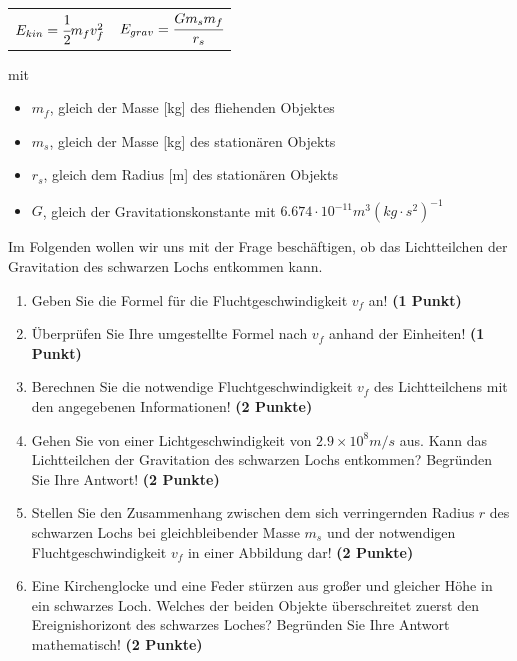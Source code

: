 \documentclass[a4paper, 9pt]{scrartcl}\usepackage[]{graphicx}\usepackage[]{xcolor}
\begin{document}
\begin{center}
  \begin{tabular}{cc}
    $E_{kin} = \cfrac{1}{2}m_fv_f^2$ & $E_{grav} = \cfrac{Gm_sm_f}{r_s}$\\
  \end{tabular}
\end{center}

mit

\begin{itemize}[noitemsep]
\item $m_f$, gleich der Masse [kg] des fliehenden Objektes
\item $m_s$, gleich der Masse [kg] des station{\"a}ren Objekts
\item $r_s$, gleich dem Radius [m] des station{\"a}ren Objekts  
\item $G$, gleich der Gravitationskonstante mit $6.674 \cdot 10^{-11}
  m^3(kg \cdot s^2)^{-1}$ 
\end{itemize}

Im Folgenden wollen wir uns mit der Frage besch{\"a}ftigen, ob das
Lichtteilchen der Gravitation des schwarzen Lochs entkommen kann.

\begin{enumerate}
\item Geben Sie die Formel f{\"u}r die Fluchtgeschwindigkeit $v_f$ an! 
  \textbf{(1 Punkt)}
\item {\"U}berpr{\"u}fen Sie Ihre umgestellte Formel nach $v_f$ anhand der Einheiten!
  \textbf{(1 Punkt)} 
\item Berechnen Sie die notwendige Fluchtgeschwindigkeit $v_f$ des
  Lichtteilchens mit den angegebenen Informationen! \textbf{(2 Punkte)}
\item Gehen Sie von einer Lichtgeschwindigkeit von $\ensuremath{2.9\times 10^{8}}m/s$
  aus. Kann das Lichtteilchen der Gravitation des schwarzen Lochs
  entkommen? Begr{\"u}nden Sie Ihre Antwort! \textbf{(2 Punkte)}
\item Stellen Sie den Zusammenhang zwischen dem sich verringernden Radius
  $r$ des schwarzen Lochs bei gleichbleibender Masse $m_s$
  und der notwendigen Fluchtgeschwindigkeit $v_f$ in einer Abbildung dar!
  \textbf{(2 Punkte)}
 \item Eine Kirchenglocke und eine Feder st{\"u}rzen aus gro{\ss}er und gleicher H{\"o}he
  in ein schwarzes Loch. Welches der beiden Objekte {\"u}berschreitet zuerst
  den Ereignishorizont des schwarzes Loches? Begr{\"u}nden
  Sie Ihre Antwort mathematisch! \textbf{(2 Punkte)}  
\end{enumerate}
\end{document}
